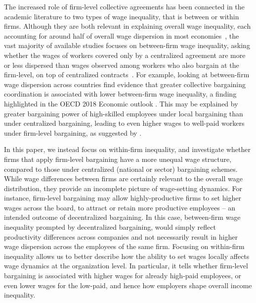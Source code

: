 \documentclass[Review,times,sageh,11pt]{sagej}
\begin{document}
The increased role of firm-level collective agreements has been connected in the academic literature to two types of wage inequality, that is between or within firms.
Although they are both relevant in explaining overall wage inequality, each accounting for around half of overall wage dispersion in most economies~\citep{lazear.shaw.2007,fournier.koske.2013,GlobalWageReport}, the vast majority of available studies focuses on between-firm wage inequality, asking whether the wages of workers covered only by a centralized agreement are more or less dispersed than wages observed among workers who also bargain at the firm-level, on top of centralized contracts~\citep[see][among others]{dellaringa.lucifora.1994, card.delarica.2006, dellaringa.pagani.2007,daouli.demoussis.ea.2013}.
For example, looking at between-firm wage dispersion across countries \citet{Berlingieri2017} find evidence that greater collective bargaining coordination is associated with lower between-firm wage inequality, a finding highlighted in the OECD 2018 Economic outlook \citep{OECD2018}. This may be explained by greater bargaining power of high-skilled employees under local bargaining than under centralized bargaining, leading to even higher wages to well-paid workers under firm-level bargaining, as suggested by \cite{dahl.lemaire.ea.2013}.

In this paper, we instead focus on within-firm inequality, and investigate whether firms that apply firm-level bargaining have a more unequal wage structure, compared to those under centralized (national or sector) bargaining schemes. While wage differences between firms are certainly relevant to the overall wage distribution, they provide an incomplete picture of wage-setting dynamics. For instance, firm-level bargaining may allow highly-productive firms to set higher wages across the board, to attract or retain more productive employees -- an intended outcome of decentralized bargaining. In this case, between-firm wage inequality prompted by decentralized bargaining, would simply reflect productivity differences across companies and not necessarily result in higher wage dispersion across the employees of the same firm. Focusing on within-firm inequality allows us to better describe how the ability to set wages locally affects wage dynamics at the organization level. In particular, it tells whether firm-level bargaining is associated with higher wages for already high-paid employees, or even lower wages for the low-paid, and hence how employers shape overall income inequality. 
\end{document}
